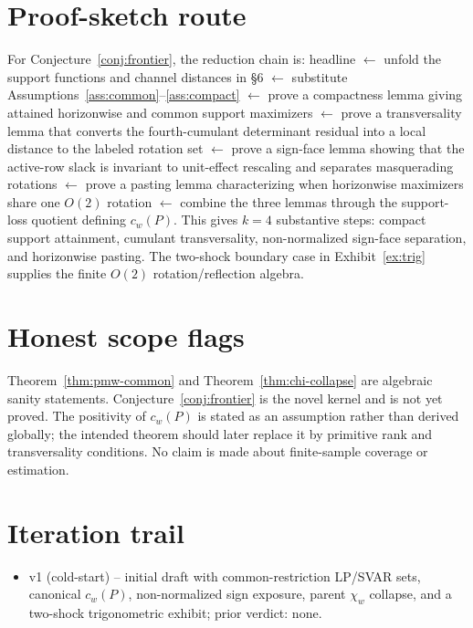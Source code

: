 \documentclass[11pt]{article}
\theoremstyle{definition}
\theoremstyle{plain}
\theoremstyle{remark}
\begin{document}
\section{Proof-sketch route}
For Conjecture~\ref{conj:frontier}, the reduction chain is:
headline \(\leftarrow\) unfold the support functions and channel distances in
\S6 \(\leftarrow\) substitute Assumptions~\ref{ass:common}--\ref{ass:compact}
\(\leftarrow\) prove a compactness lemma giving attained horizonwise and common
support maximizers \(\leftarrow\) prove a transversality lemma that converts the
fourth-cumulant determinant residual into a local distance to the labeled
rotation set \(\leftarrow\) prove a sign-face lemma showing that the active-row
slack is invariant to unit-effect rescaling and separates masquerading rotations
\(\leftarrow\) prove a pasting lemma characterizing when horizonwise maximizers
share one \(O(2)\) rotation \(\leftarrow\) combine the three lemmas through the
support-loss quotient defining \(c_w(P)\). This gives \(k=4\) substantive steps:
compact support attainment, cumulant transversality, non-normalized sign-face
separation, and horizonwise pasting. The two-shock boundary case in
Exhibit~\ref{ex:trig} supplies the finite \(O(2)\) rotation/reflection algebra.

\section{Honest scope flags}
Theorem~\ref{thm:pmw-common} and Theorem~\ref{thm:chi-collapse} are algebraic
sanity statements. Conjecture~\ref{conj:frontier} is the novel kernel and is not
yet proved. The positivity of \(c_w(P)\) is stated as an assumption rather than
derived globally; the intended theorem should later replace it by primitive
rank and transversality conditions. No claim is made about finite-sample
coverage or estimation.

\section{Iteration trail}
\begin{itemize}[leftmargin=*]
\item v1 (cold-start) -- initial draft with common-restriction LP/SVAR sets,
canonical \(c_w(P)\), non-normalized sign exposure, parent \(\chi_w\) collapse,
and a two-shock trigonometric exhibit; prior verdict: none.
\end{itemize}
\end{document}
